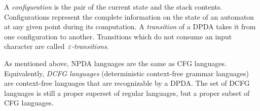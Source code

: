 A \emph{configuration} is the pair of the current state and the stack contents.
Configurations represent the complete information on the 
    state of an automaton at any given point during its computation.
A \emph{transition} of a DPDA takes it from one configuration to another.
Transitions which do not consume an input character are called~\emph{$ε$-transitions}.

As mentioned above, NPDA languages are the same as CFG languages.
Equivalently, \emph{DCFG languages} (deterministic context-free grammar languages)
  are context-free languages that are recognizable by a DPDA\@.
The set of DCFG languages is still a proper superset of regular languages,
  but a proper subset of CFG languages.
